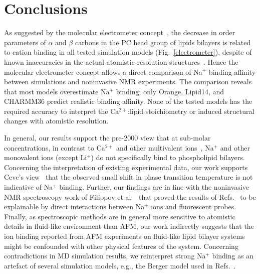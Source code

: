 \documentclass[twoside,twocolumn,9pt]{article}
\begin{document}
\section{Conclusions}
As suggested by the molecular electrometer concept~\cite{akutsu81,altenbach84,seelig87,scherer89},
the decrease in order parameters of $\alpha$ and $\beta$ carbons in the PC head group of lipids bilayers
is related to cation binding  in all tested simulation models (Fig.~\ref{electrometer}), despite of known inaccuracies 
in the actual atomistic resolution structures~\cite{botan15}. Hence the molecular electrometer concept allows a direct comparison
of Na$^+$ binding affinity between simulations and noninvasive NMR experiments.
The comparison reveals that most models overestimate Na$^+$ binding; only Orange, Lipid14, and CHARMM36 
predict realistic binding affinity. None of the tested models has the required accuracy to interpret
the Ca$^{2+}$:lipid stoichiometry or induced structural changes with atomistic resolution.

In general, our results support the pre-2000 view that at sub-molar concentrations, in contrast to Ca$^{2+}$ and other multivalent ions~\cite{eisenberg79,akutsu81,altenbach84,tatulian87,cevc90,tocanne90,clarke99,binder02,pabst07,filippov09},
Na$^+$ and other monovalent ions (except Li$^+$) do not specifically bind to phospholipid bilayers.
Concerning the interpretation of existing experimental data, our work supports Cevc's view~\cite{cevc90}
that the observed small shift in phase transition temperature is not indicative of Na$^+$ binding.
Further, our findings are in line with the noninvasive NMR spectroscopy work of Filippov et al.~\cite{filippov09} 
that proved the results of Refs.~ to be explainable by direct interactions between Na$^+$ ions and fluorescent probes.
Finally, as spectroscopic methods are in general more sensitive to atomistic details in fluid-like environment than AFM, our work indirectly suggests that the ion 
binding reported from AFM experiments on fluid-like lipid bilayer systems~\cite{manyes05,manyes06,fukuma07,ferber11,morata12} might be confounded with other physical features of the system.
Concerning contradictions in MD simulation results, we reinterpret strong Na$^+$ binding as an artefact of several simulation models, e.g., the Berger model used in Refs.~.
\end{document}
